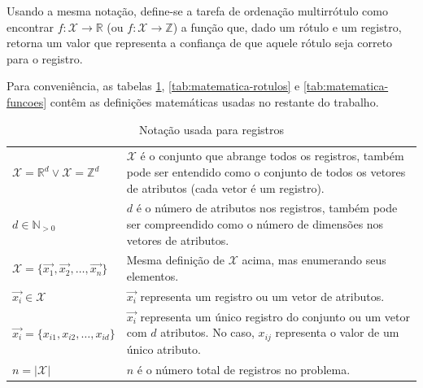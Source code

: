 \documentclass[runningheads,a4paper]{llncs}
\begin{document}
Usando a mesma notação, define-se a tarefa de ordenação multirrótulo como encontrar $f : \mathcal{X} \to \mathbb{R}$ (ou $f : \mathcal{X} \to \mathbb{Z}$) a função que, dado um rótulo e um registro, retorna um valor que representa a confiança de que aquele rótulo seja correto para o registro.

Para conveniência, as tabelas \ref{tab:matematica-registros}, \ref{tab:matematica-rotulos} e \ref{tab:matematica-funcoes} contêm as definições matemáticas usadas no restante do trabalho.

\begin{table}
	\centering
	\begin{tabular}{| >{\centering}p{4cm} | m{8cm} |}
		\hline
		\multicolumn{2}{|c|}{\textit{Registros ou vetores de atributos}} \\
		\hline
		$\mathcal{X} = \mathbb{R}^d \vee \mathcal{X} = \mathbb{Z}^d$ & $\mathcal{X}$ é o conjunto que abrange todos os registros, também pode ser entendido como o conjunto de todos os vetores de atributos (cada vetor é um registro). \\
		\hline
		$d \in \mathbb{N}_{>0}$ & $d$ é o número de atributos nos registros, também pode ser compreendido como o número de dimensões nos vetores de atributos. \\
		\hline
		$\mathcal{X} = \{\vec{x_1}, \vec{x_2}, \dots, \vec{x_n}\}$ & Mesma definição de $\mathcal{X}$ acima, mas enumerando seus elementos. \\
		\hline
		$\vec{x_i} \in \mathcal{X}$ & $\vec{x_i}$ representa um registro ou um vetor de atributos. \\
		\hline
		$\vec{x_i} = \{x_{i1}, x_{i2}, \dots, x_{id}\}$ & $\vec{x_i}$ representa um único registro do conjunto ou um vetor com $d$ atributos. No caso, $x_{ij}$ representa o valor de um único atributo. \\
		\hline
		$n = |\mathcal{X}|$ & $n$ é o número total de registros no problema. \\
		\hline
	\end{tabular}
	\caption{Notação usada para registros}
	\label{tab:matematica-registros}
\end{table}
\end{document}
